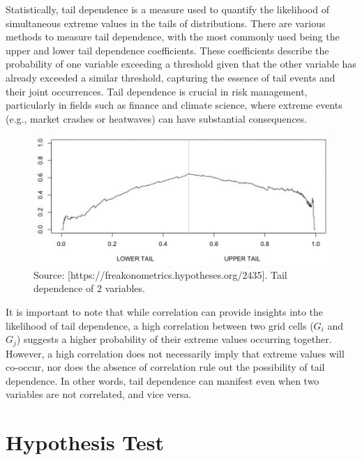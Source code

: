 \documentclass[
]{krantz}
\begin{document}
Statistically, tail dependence is a measure used to quantify the likelihood of simultaneous extreme values in the tails of distributions. There are various methods to measure tail dependence, with the most commonly used being the upper and lower tail dependence coefficients. These coefficients describe the probability of one variable exceeding a threshold given that the other variable has already exceeded a similar threshold, capturing the essence of tail events and their joint occurrences. Tail dependence is crucial in risk management, particularly in fields such as finance and climate science, where extreme events (e.g., market crashes or heatwaves) can have substantial consequences.

\vspace{1em}
\begin{figure}

{\centering \includegraphics[width=0.8\linewidth]{work/06-anthropo/figures/tail} 

}

\caption{Source: [https://freakonometrics.hypotheses.org/2435]. Tail dependence of 2 variables.}\label{fig:unnamed-chunk-7}
\end{figure}
\vspace{1em}

It is important to note that while correlation can provide insights into the likelihood of tail dependence, a high correlation between two grid cells (\(G_i\) and \(G_j\)) suggests a higher probability of their extreme values occurring together. However, a high correlation does not necessarily imply that extreme values will co-occur, nor does the absence of correlation rule out the possibility of tail dependence. In other words, tail dependence can manifest even when two variables are not correlated, and vice versa.

\section{Hypothesis Test}\label{hypothesis-test}
\end{document}
